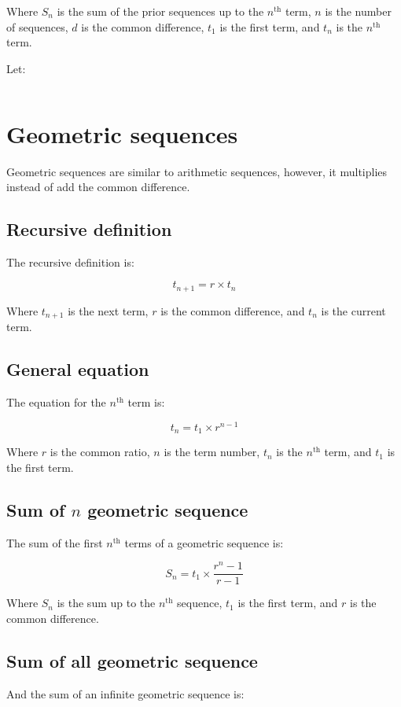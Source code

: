 \documentclass{book}
\newenvironment{explanationOfTerms}{}{}
\newenvironment{example}{}{}
\begin{document}
\begin{explanationOfTerms}
	Where $S_n$ is the sum of the prior sequences up to the $n^{\text{th}}$ term, $n$ is the number of sequences, $d$ is the common difference, $t_1$ is the first term, and $t_n$ is the $n^{\text{th}}$ term.
\end{explanationOfTerms}

\begin{example}
	Let:

	\[
		
	\]

\end{example}


\section{Geometric sequences}
Geometric sequences are similar to arithmetic sequences, however, it multiplies instead of add the common difference.


\subsection{Recursive definition}
The recursive definition is:

\[
	t_{n + 1} = r \times t_n
\]

Where $t_{n + 1}$ is the next term, $r$ is the common difference, and $t_n$ is the current term.


\subsection{General equation}
The equation for the $n^{\text{th}}$ term is:

\[
	t_n = t_1 \times r^{n - 1}
\]

Where $r$ is the common ratio, $n$ is the term number, $t_n$ is the $n^{\text{th}}$ term, and $t_1$ is the first term.


\subsection{Sum of $n$ geometric sequence}
The sum of the first $n^{\text{th}}$ terms of a geometric sequence is:

\[
	S_n = t_1 \times \frac{r^n - 1}{r - 1}
\]

Where $S_n$ is the sum up to the $n^{\text{th}}$ sequence, $t_1$ is the first term, and $r$ is the common difference.


\subsection{Sum of all geometric sequence}
And the sum of an infinite geometric sequence is:
\end{document}
